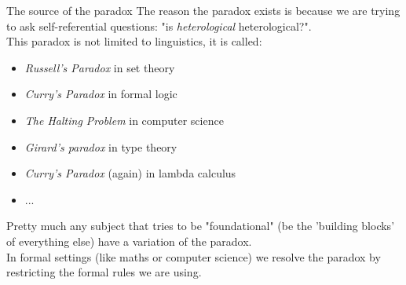 \begin{frame}{The source of the paradox}
	The reason the paradox exists is because we are trying to ask self-referential questions: "is \textit{heterological} heterological?".\pause\\
	This paradox is not limited to linguistics\pause, it is called:\\
	\begin{itemize}
		\item \textit{Russell's Paradox} in set theory\pause
		\item \textit{Curry's Paradox} in formal logic\pause
		\item \textit{The Halting Problem} in computer science\pause
		\item \textit{Girard's paradox} in type theory\pause
		\item \textit{Curry's Paradox} (again) in lambda calculus\pause
		\item ...\pause
	\end{itemize}
	Pretty much any subject that tries to be "foundational" (be the 'building blocks' of everything else) have a variation of the paradox.\pause\\
	In formal settings (like maths or computer science) we resolve the paradox by restricting the formal rules we are using.
\end{frame}
